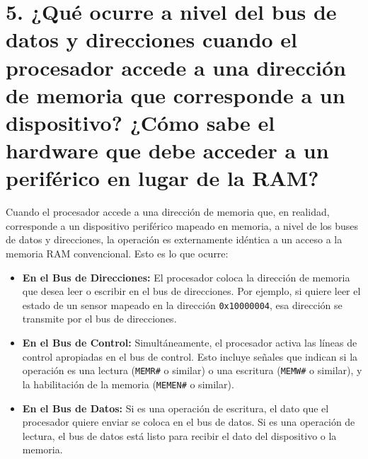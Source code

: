 \documentclass[12pt, a4paper]{article}
\begin{document}
\section*{5. ¿Qué ocurre a nivel del bus de datos y direcciones cuando el procesador accede a una dirección de memoria que corresponde a un dispositivo? ¿Cómo sabe el hardware que debe acceder a un periférico en lugar de la RAM?}
Cuando el procesador accede a una dirección de memoria que, en realidad, corresponde a un dispositivo periférico mapeado en memoria, a nivel de los buses de datos y direcciones, la operación es externamente idéntica a un acceso a la memoria RAM convencional. Esto es lo que ocurre:
\begin{itemize}
    \item \textbf{En el Bus de Direcciones:} El procesador coloca la dirección de memoria que desea leer o escribir en el bus de direcciones. Por ejemplo, si quiere leer el estado de un sensor mapeado en la dirección \texttt{0x10000004}, esa dirección se transmite por el bus de direcciones.
    \item \textbf{En el Bus de Control:} Simultáneamente, el procesador activa las líneas de control apropiadas en el bus de control. Esto incluye señales que indican si la operación es una lectura (\texttt{MEMR\#} o similar) o una escritura (\texttt{MEMW\#} o similar), y la habilitación de la memoria (\texttt{MEMEN\#} o similar).
    \item \textbf{En el Bus de Datos:} Si es una operación de escritura, el dato que el procesador quiere enviar se coloca en el bus de datos. Si es una operación de lectura, el bus de datos está listo para recibir el dato del dispositivo o la memoria.
\end{itemize}
\end{document}
